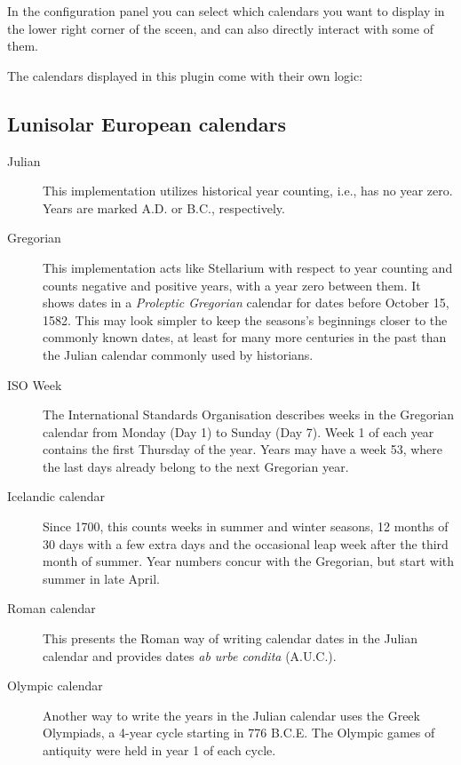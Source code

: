 In the configuration panel you can select which calendars you want to
display in the lower right corner of the sceen, and can also directly
interact with some of them.


The calendars displayed in this plugin come with their own logic:

\subsection{Lunisolar European calendars}
\begin{description}
\item[Julian] This implementation utilizes historical year counting,
  i.e., has no year zero. Years are marked A.D. or B.C., respectively.
\item[Gregorian] This implementation acts like Stellarium with respect
  to year counting and counts negative and positive years, with a year
  zero between them. It shows dates in a \emph{Proleptic Gregorian}
  calendar for dates before October 15, 1582. This may look simpler to
  keep the seasons's beginnings closer to the commonly known dates, at
  least for many more centuries in the past than the Julian calendar
  commonly used by historians.
\item[ISO Week] The International Standards Organisation describes
  weeks in the Gregorian calendar from Monday (Day 1) to Sunday (Day
  7). Week 1 of each year contains the first Thursday of the
  year. Years may have a week 53, where the last days already belong
  to the next Gregorian year.
\item[Icelandic calendar] Since 1700, this counts weeks in summer and
  winter seasons, 12 months of 30 days with a few extra days and the
  occasional leap week after the third month of summer. Year numbers
  concur with the Gregorian, but start with summer in late April.
\item[Roman calendar] This presents the Roman way of writing calendar
  dates in the Julian calendar and provides dates \emph{ab urbe condita} (A.U.C.).
\item[Olympic calendar] Another way to write the years in the Julian
  calendar uses the Greek Olympiads, a 4-year cycle starting in 776
  B.C.E. The Olympic games of antiquity were held in year 1 of each cycle.
\end{description}


